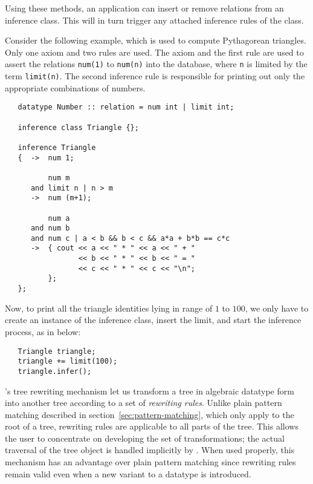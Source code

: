 
Using these methods, an application can insert or remove relations
from an inference class.  This will in turn trigger any attached inference
rules of the class.
 
 
Consider the following example, which is used to compute Pythagorean
triangles.  Only one axiom and two rules are used.  The axiom and the
first rule are used to assert the relations \verb|num(1)| to \verb|num(n)|
into the database, where \verb|n| is limited by the term \verb|limit(n)|.
The second inference rule is responsible for printing out only
the appropriate combinations of numbers.
 
\begin{verbatim}
   datatype Number :: relation = num int | limit int;
 
   inference class Triangle {};
 
   inference Triangle
   {  ->  num 1;
 
          num m
      and limit n | n > m
      ->  num (m+1);
 
          num a
      and num b
      and num c | a < b && b < c && a*a + b*b == c*c
      ->  { cout << a << " * " << a << " + "
                 << b << " * " << b << " = "
                 << c << " * " << c << "\n";
          };
   };
\end{verbatim}
 
Now, to print all the triangle identities lying in range of $1$ to $100$,
we only have to create an instance of the inference class, insert the
limit, and start the inference process, as in below:
 
\begin{verbatim}
   Triangle triangle;
   triangle += limit(100);
   triangle.infer();
\end{verbatim}

\INCOMPLETE

\INCOMPLETE
 
 \label{sec:tree-rewriting} 

\Prop's tree rewriting mechanism let us transform a tree in
algebraic datatype form into another tree according to a set of 
{\em rewriting rules}.  Unlike plain pattern matching described
in section~\ref{sec:pattern-matching}, which only apply to the
root of a tree, rewriting rules are applicable to all parts of
the tree.  This allows the user to concentrate on developing the
set of transformations; the actual traversal of the tree object
is handled implicitly by \Prop.  When used properly, this
mechanism has an advantage over plain pattern matching since
rewriting rules remain valid even when a new variant to a datatype
is introduced.

